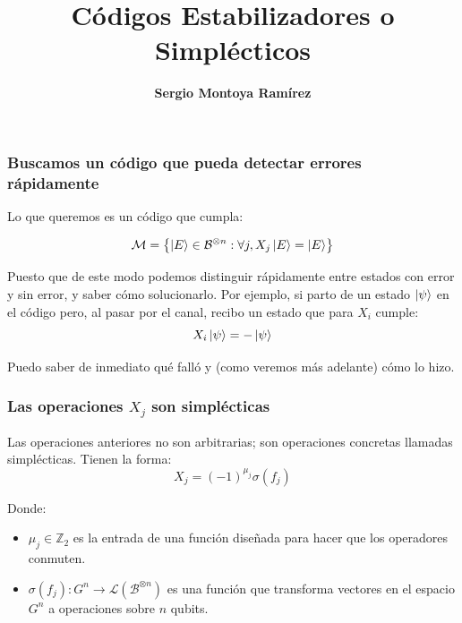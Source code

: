 \documentclass[english,9pt]{Linnaeus}
\author[S1e7J]{\textbf{Sergio Montoya Ramírez}}
\institute{s.montoyar2@uniandes.edu.co}
\title{\LARGE \textbf{Códigos Estabilizadores o Simplécticos}}
\date{}
\begin{document}
\begin{frame}[plain]
\titlepage
\end{frame}


\begin{frame}
  \frametitle{Buscamos un código que pueda detectar errores rápidamente}

  Lo que queremos es un código que cumpla:

  \begin{equation}
    \mathcal{M} = \left\{ \ket{E} \in \mathcal{B}^{\otimes n} : \forall j, X_j \ket{E} = \ket{E}\right\}
    \label{eq:stabilizers}
  \end{equation}

  Puesto que de este modo podemos distinguir rápidamente entre estados con error y sin error, y saber cómo solucionarlo. Por ejemplo, si parto de un estado $\ket{\psi}$ en el código pero, al pasar por el canal, recibo un estado que para $X_i$ cumple:
  \begin{equation}
    X_i \ket{\psi} = - \ket{\psi}
    \label{eq:stabilizers2}
  \end{equation}

  Puedo saber de inmediato qué falló y (como veremos más adelante) cómo lo hizo.
\end{frame}


\begin{frame}
  \frametitle{Las operaciones $X_j$ son simplécticas}

  Las operaciones anteriores no son arbitrarias; son operaciones concretas llamadas simplécticas. Tienen la forma:
  \begin{equation}
    X_j = (-1)^{\mu_j} \sigma(f_j)
    \label{eq:symplectic}
  \end{equation}

  Donde:
  \begin{itemize}
    \item $\mu_j \in \mathbb{Z}_2$ es la entrada de una función diseñada para hacer que los operadores conmuten.
    \item $\sigma(f_j) : G^n \to \mathcal{L}(\mathcal{B}^{\otimes n})$ es una función que transforma vectores en el espacio $G^n$ a operaciones sobre $n$ qubits.
  \end{itemize}
\end{frame}
\end{document}
